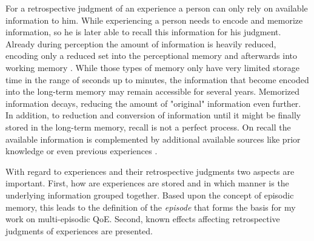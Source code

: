 %

For a retrospective judgment of an experience a person can only rely on available information to him.
While experiencing a person needs to encode and memorize information, so he is later able to recall this information for his judgment.
Already during perception the amount of information is heavily reduced, encoding only a reduced set into the perceptional memory and afterwards into working memory \cite[\cf, ][p. 8f.]{raake_speech_2006}.
While those types of memory only have very limited storage time in the range of seconds up to minutes, the information that become encoded into the long-term memory may remain accessible for several years.
Memorized information decays, reducing the amount of "original" information even further.
In addition, to reduction and conversion of information until it might be finally stored in the long-term memory, recall is not a perfect process.
On recall the available information is complemented by additional available sources like prior knowledge or even previous experiences \citep{schacter_seven_2003}.

With regard to experiences and their retrospective judgments two aspects are important.
First, how are experiences are stored and in which manner is the underlying information grouped together.
Based upon the concept of episodic memory, this leads to the definition of the \emph{episode} that forms the basis for my work on multi-episodic \ac{QoE}.
Second, known effects affecting retrospective judgments of experiences are presented.

